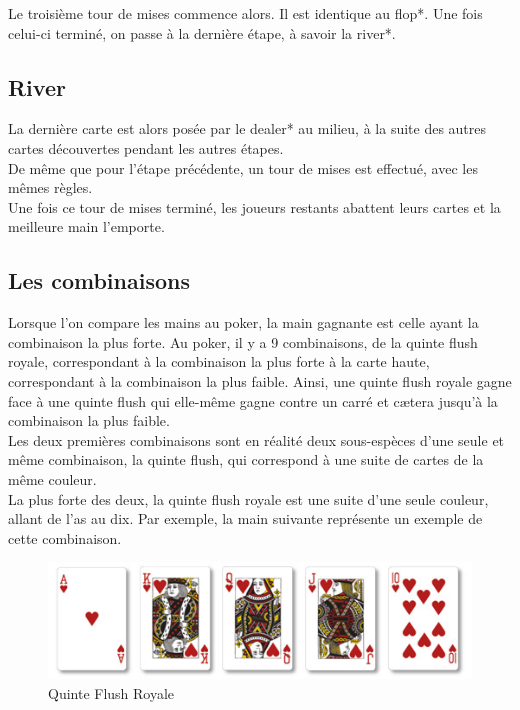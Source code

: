 \documentclass{report}
\begin{document}
Le troisième tour de mises commence alors. Il est identique au flop*. Une fois celui-ci terminé, on passe à la dernière étape, à savoir la river*.\par
\subsection{River}
\hspace{0.5cm}La dernière carte est alors posée par le dealer* au milieu, à la suite des autres cartes découvertes pendant les autres étapes. \\

De même que pour l'étape précédente, un tour de mises est effectué, avec les mêmes règles.\\

Une fois ce tour de mises terminé, les joueurs restants abattent leurs cartes et la meilleure main l'emporte.\par

\subsection{Les combinaisons}
\hspace{0.5cm}Lorsque l'on compare les mains au poker, la main gagnante est celle ayant la combinaison la plus forte. Au poker, il y a 9 combinaisons, de la quinte flush royale, correspondant à la combinaison la plus forte à la carte haute, correspondant à la combinaison la plus faible. Ainsi, une quinte flush royale gagne face à une quinte flush qui elle-même gagne contre un carré et cætera jusqu'à la combinaison la plus faible. \\

Les deux premières combinaisons sont en réalité deux sous-espèces d'une seule et même combinaison, la quinte flush, qui correspond à une suite de cartes de la même couleur.\\

La plus forte des deux, la quinte flush royale est une suite d'une seule couleur, allant de l'as au dix. Par exemple, la main suivante représente un exemple de cette combinaison. \par

		\begin{figure}[h]
			\begin{center}
				\includegraphics[scale=0.3]{./imagesRapport/quinteFlushRoyale.jpg}
			\end{center}
			\caption[Quinte Flush Royale]{Quinte Flush Royale}
		\end{figure}
		\medskip
\end{document}
